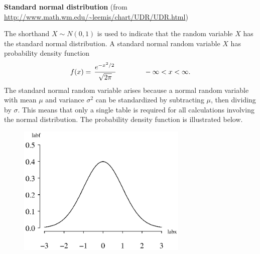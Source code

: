 \documentclass[12pt,fullpage]{article}
\begin{document}
\noindent
{\bf Standard normal distribution} (from \color{blue}\url{http://www.math.wm.edu/~leemis/chart/UDR/UDR.html}\color{black})

\noindent
The shorthand $X \sim N(0,1)$ is used to indicate that the random variable $X$ has the standard normal distribution.
A standard normal random variable $X$ has probability density function 
$$
f(x) = \,{\frac {{e^{-x^{\kern 0.04 em 2}/2\,}}}{\sqrt {
2\pi }}}  \qquad \qquad  -\infty < x < \infty .
$$
The standard normal random variable arises because 
a normal random variable with mean $\mu$ and variance $\sigma ^ 2$ can
be standardized by subtracting $\mu$, then dividing by $\sigma$.
This means that only a single table is required for all calculations
involving the normal distribution.
The probability density function is illustrated below.
{\begin{figure}[h!]
\begin{center}
\includegraphics[width=3.2in]{StandardnormalPlot.ps}
\end{center}
\end{figure}}
\end{document}
